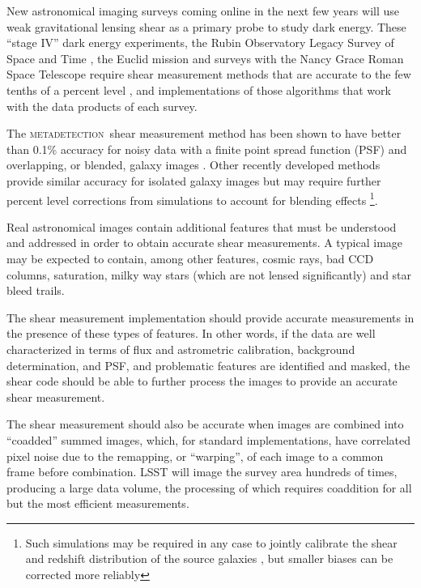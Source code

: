 \documentclass[twocolumn,twocolappendix,astrosym]{openjournal}
\newcommand{\mdet}{\textsc{metadetection}}
\begin{document}
New astronomical imaging surveys coming online in the next few years will use
weak gravitational lensing shear as a primary probe to study dark energy.
These ``stage IV'' dark energy experiments, the Rubin Observatory Legacy Survey
of Space and Time \citep[LSST,][]{IvezicLSST2008}, the Euclid mission
\citep{Euclid2011} and surveys with the Nancy Grace Roman Space Telescope
\citep{Roman2015} require shear measurement methods that are accurate to the
few tenths of a percent level \citep{Massey2013,SRD}, and implementations of
those algorithms that work with the data products of each survey.

The \mdet\ shear measurement method \citep{mdet20} has been shown to have
better than 0.1\% accuracy for noisy data with a finite point spread function
(PSF) and overlapping, or blended, galaxy images
\citep{mdet20,HoekstraMdet2021a,HoekstraMdet2021b}.  Other recently developed
methods provide similar accuracy for isolated galaxy images \citep{BernBFD2016,
LiFPFSBlending2022} but may require further percent level corrections from
simulations to account for blending effects
\citep{mdet20,LiFPFSBlending2022}\footnote{Such simulations may be required in
any case to jointly calibrate the shear and redshift distribution of the source
galaxies \citep{MacCrann2022,LiNofz2022}, but smaller biases can be corrected
more reliably}.

Real astronomical images contain additional features that must be understood
and addressed in order to obtain accurate shear measurements.  A typical image
may be expected to contain, among other features, cosmic rays, bad CCD columns,
saturation, milky way stars (which are not lensed significantly) and star bleed
trails.

The shear measurement implementation should provide accurate measurements in
the presence of these types of features.  In other words, if the data are well
characterized in terms of flux and astrometric calibration, background
determination, and PSF, and problematic features are identified and masked, the
shear code should be able to further process the images to provide an accurate
shear measurement.

The shear measurement should also be accurate when images are combined into
``coadded'' summed images, which, for standard implementations, have correlated
pixel noise due to the remapping, or ``warping'', of each image to a common
frame before combination.  LSST will image the survey area hundreds of times,
producing a large data volume, the processing of which requires coaddition for
all but the most efficient measurements.
\end{document}
